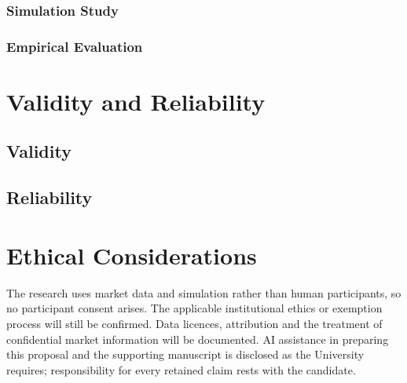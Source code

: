\documentclass[12pt,final]{article}
\begin{document}
	\subsubsection{Simulation Study}

	\subsubsection{Empirical Evaluation}

	\section{Validity and Reliability} %

	\subsection{Validity}

	\subsection{Reliability}

	\section{Ethical Considerations} %

	The research uses market data and simulation rather than human participants,
	so no participant consent arises. The applicable institutional ethics or
	exemption process will still be confirmed. Data licences, attribution and the
	treatment of confidential market information will be documented. AI
	assistance in preparing this proposal and the supporting manuscript is
	disclosed as the University requires; responsibility for every retained claim
	rests with the candidate.
\end{document}
